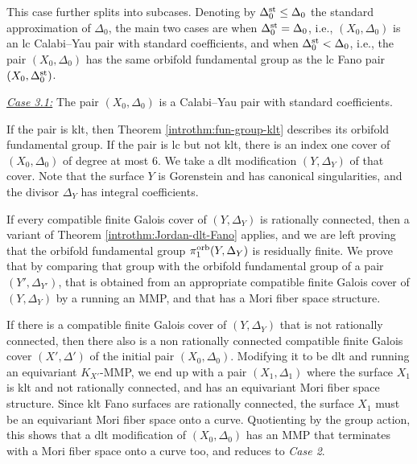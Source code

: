 \documentclass{amsart}
\theoremstyle{definition}
\theoremstyle{remark}
\numberwithin{equation}{section}
\newcommand{\cecile}[1]{\textcolor{red}{#1}}
\begin{document}
This case further splits into subcases. Denoting by $\Delta_0^{\rm st}\le \Delta_0$ the standard approximation of $\Delta_0$, the main two cases are when $\Delta_0^{\rm st} = \Delta_0$, i.e., $(X_0,\Delta_0)$ is an lc Calabi--Yau pair with standard coefficients, and when $\Delta_0^{\rm st} < \Delta_0$, i.e., the pair $(X_0,\Delta_0)$ has the same orbifold fundamental group as the lc Fano pair $(X_0,\Delta_0^{\rm st})$. 


\medskip 

\hfill \begin{minipage}{0.95\textwidth}
\noindent\underline{\textit{Case 3.1:}} The pair $(X_0,\Delta_0)$ is a Calabi--Yau pair with standard coefficients.

\medskip

If the pair is klt, then Theorem \ref{introthm:fun-group-klt} describes its orbifold fundamental group. If the pair is lc but not klt, there is an index one cover of $(X_0,\Delta_0)$ of degree at most $6$. We take a dlt modification $(Y,\Delta_Y)$ of that cover. Note that the surface $Y$ is Gorenstein and has canonical singularities, and the divisor $\Delta_Y$ has integral coefficients.

\medskip

If every compatible finite Galois cover of $(Y,\Delta_Y)$ is rationally connected, then a variant of Theorem \ref{introthm:Jordan-dlt-Fano} applies, and we are left proving that the orbifold fundamental group $\pi_1^{\rm orb}(Y,\Delta_Y)$ is residually finite. We prove that by comparing that group with the orbifold fundamental group of a pair $(Y',\Delta_{Y'})$, that is obtained from an appropriate compatible finite Galois cover of $(Y,\Delta_Y)$ by a running an MMP, and that has a Mori fiber space structure.

\medskip

If there is a compatible finite Galois cover of $(Y,\Delta_Y)$ that is not rationally connected, then there also is a non rationally connected compatible finite Galois cover $(X',\Delta')$ of the initial pair $(X_0,\Delta_0)$. Modifying it to be dlt and running an equivariant $K_{X'}$-MMP, we end up with a pair $(X_1,\Delta_1)$ where the surface $X_1$ is klt and not rationally connected, and has an equivariant Mori fiber space structure. Since klt Fano surfaces are rationally connected, the surface $X_1$ must be an equivariant Mori fiber space onto a curve. Quotienting by the group action, this shows that a dlt modification of $(X_0,\Delta_0)$ has an MMP that terminates with a Mori fiber space onto a curve too, and reduces to {\it Case 2}.
\end{minipage}
\end{document}
